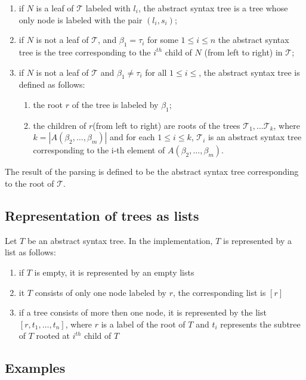 \documentclass[a4paper,10pt]{article}
\begin{document}
\begin{enumerate}
\item if $N$ is a leaf of $\mathcal{T}$ labeled with $l_i$, the abstract syntax tree is a tree whose only node is labeled with the pair $(l_i,s_i)$;

\item if $N$ is not a leaf of $\mathcal{T}$, and $\beta_1=\tau_i$ for some $1\le i\le n$ the abstract syntax tree is the tree corresponding to the $i^{th}$ child of $N$ (from left to right) in $\mathcal{T}$;

\item if $N$ is not a leaf of $\mathcal{T}$  and $\beta_1\not=\tau_i$ for all $1\le i\le$, the abstract syntax tree is defined as follows:
\begin{enumerate}
\item the root $r$ of the tree is labeled by $\beta_1$;
\item the children of $r$(from left to right) are roots of the trees $\mathcal{T}_1, \ldots \mathcal{T}_k$, where $k = |A(\beta_2,\ldots,\beta_m)|$ and for each $1 \le i\le k$,  $\mathcal{T}_i$ is an abstract syntax tree corresponding to the i-th element of $A(\beta_2,\ldots,\beta_m)$.
\end{enumerate}
 
\end{enumerate}

The result of the parsing is defined to be the abstract syntax tree corresponding to the root of $\mathcal{T}$.  


\subsection{Representation of trees as lists}
Let $T$ be an abstract syntax tree.
In the implementation, $T$ is  represented by a list as follows:
\begin{enumerate}
\item if $T$ is empty, it is represented by an empty lists
\item it $T$ consists of only one node labeled by $r$, the corresponding list is $[r]$
\item if a tree consists of more then one node, it is represented by the list $[r,t_1,\ldots,t_n]$, where $r$ is a label of the root of $T$ and  $t_i$ represents the subtree of $T$ rooted at $i^{th}$ child of $T$ 
\end{enumerate}

\subsection{Examples}
\end{document}

